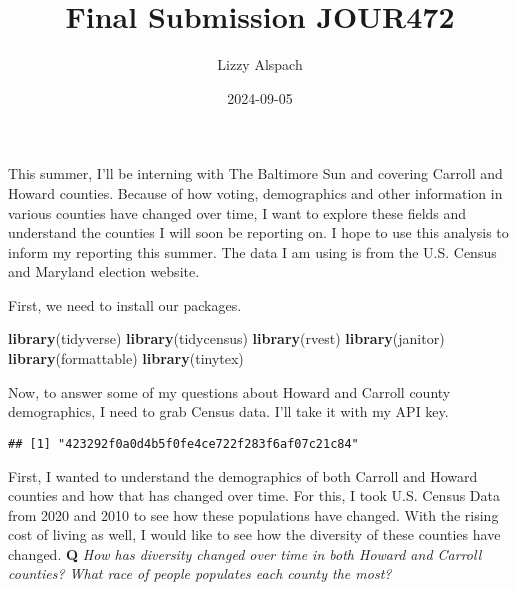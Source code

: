 \documentclass[
]{article}
\title{Final Submission JOUR472}
\author{Lizzy Alspach}
\date{2024-09-05}
\newenvironment{Shaded}{\begin{snugshade}}{\end{snugshade}}
\newcommand{\FunctionTok}[1]{\textcolor[rgb]{0.13,0.29,0.53}{\textbf{#1}}}
\newcommand{\NormalTok}[1]{#1}
\begin{document}
\maketitle

This summer, I'll be interning with The Baltimore Sun and covering
Carroll and Howard counties. Because of how voting, demographics and
other information in various counties have changed over time, I want to
explore these fields and understand the counties I will soon be
reporting on. I hope to use this analysis to inform my reporting this
summer. The data I am using is from the U.S. Census and Maryland
election website.

First, we need to install our packages.

\begin{Shaded}
\begin{Highlighting}[]
\FunctionTok{library}\NormalTok{(tidyverse)}
\FunctionTok{library}\NormalTok{(tidycensus)}
\FunctionTok{library}\NormalTok{(rvest)}
\FunctionTok{library}\NormalTok{(janitor)}
\FunctionTok{library}\NormalTok{(formattable)}
\FunctionTok{library}\NormalTok{(tinytex)}
\end{Highlighting}
\end{Shaded}

Now, to answer some of my questions about Howard and Carroll county
demographics, I need to grab Census data. I'll take it with my API key.

\begin{verbatim}
## [1] "423292f0a0d4b5f0fe4ce722f283f6af07c21c84"
\end{verbatim}

First, I wanted to understand the demographics of both Carroll and
Howard counties and how that has changed over time. For this, I took
U.S. Census Data from 2020 and 2010 to see how these populations have
changed. With the rising cost of living as well, I would like to see how
the diversity of these counties have changed. \textbf{Q} \emph{How has
diversity changed over time in both Howard and Carroll counties? What
race of people populates each county the most?}
\end{document}
